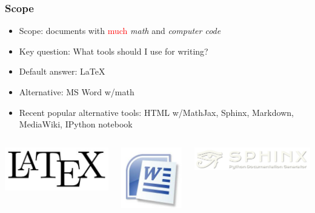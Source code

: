 \documentclass{beamer}
\begin{document}
\begin{frame}
\frametitle{Scope}


\begin{itemize}
  \item<2-> Scope: documents with \textcolor{red}{much} \emph{math} and \emph{computer code}

  \item<3-> Key question: What tools should I use for writing?

  \item<4-> Default answer: {\LaTeX}

  \item<5-> Alternative: MS Word w/math

  \item<6-> Recent popular alternative tools: HTML w/MathJax,
    Sphinx, Markdown, MediaWiki, IPython notebook
\end{itemize}

\noindent

\begin{columns}
\begin{center}  %
  \centerline{\includegraphics[width=0.3\linewidth]{../doc/slides/fig/LaTeX_logo.jpg}}
\end{center}


\begin{center}  %
  \centerline{\includegraphics[width=0.2\linewidth]{../doc/slides/fig/MS_Word_logo.jpg}}
\end{center}


\begin{center}  %
  \centerline{\includegraphics[width=0.4\linewidth]{../doc/slides/fig/sphinx_logo.png}}
\end{center}



\end{columns}
\end{frame}
\end{document}
